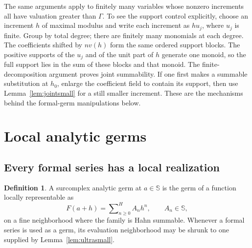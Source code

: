 \documentclass[11pt,a4paper]{article}
\theoremstyle{definition}
\newtheorem{definition}[theorem]{Definition}
\theoremstyle{remark}
\newcommand{\SC}{\mathbb S}
\newcommand{\Hs}{\mathop{\sum}\nolimits^{\!H}}
\begin{document}
The same arguments apply to finitely many variables whose nonzero
increments all have valuation greater than $\Gamma$. To see the support
control explicitly, choose an increment $h$ of maximal modulus and write
each increment as $h u_j$, where $u_j$ is finite. Group by total degree;
there are finitely many monomials at each degree. The coefficients shifted
by $n v(h)$ form the same ordered support blocks. The positive supports
of the $u_j$ and of the unit part of $h$ generate one monoid, so the
full support lies in the sum of these blocks and that monoid. The
finite-decomposition argument proves joint summability. If one first
makes a summable substitution at $h_0$, enlarge the coefficient field
to contain its support, then use Lemma~\ref{lem:jointsmall} for a
still smaller increment. These are the mechanisms behind the
formal-germ manipulations below.

\section{Local analytic germs}\label{sec:germs}
\subsection{Every formal series has a local realization}
\begin{definition}
A surcomplex analytic germ at $a\in\SC$ is the germ of a function
locally representable as
\[
 F(a+h)=\Hs_{n\ge0} A_n h^n,\qquad A_n\in\SC,
\]
on a fine neighborhood where the family is Hahn summable. Whenever a
formal series is used as a germ, its evaluation neighborhood may be
shrunk to one supplied by Lemma~\ref{lem:ultrasmall}.
\end{definition}
\end{document}

